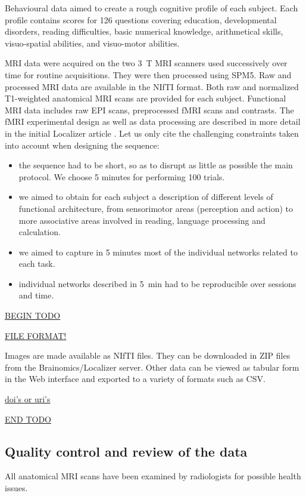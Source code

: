 \documentclass[review]{elsarticle}
\begin{document}
Behavioural data aimed to create a rough cognitive profile of each subject. Each profile contains scores for 126 questions covering education, developmental disorders, reading difficulties, basic numerical knowledge, arithmetical skills, visuo-spatial abilities, and visuo-motor abilities.

MRI data were acquired on the two 3~T MRI scanners used successively over
time for routine acquisitions. They were then processed using SPM5. Raw and processed
MRI data are available in the NIfTI format. Both raw and normalized T1-weighted
anatomical MRI scans are provided for each subject. Functional MRI data includes
raw EPI scans, preprocessed fMRI scans and contrasts. The fMRI experimental design
as well as data processing are described in more detail in the initial Localizer
article \cite{Pinel2007}. Let us only cite the challenging constraints taken
into account when designing the sequence:
\begin{itemize}
\item the sequence had to be short, so as to disrupt as little as possible the main protocol. We choose 5 minutes for performing 100 trials.
\item we aimed to obtain for each subject a description of different levels of functional architecture, from sensorimotor areas (perception and action) to more associative areas involved in reading, language processing and calculation.
\item we aimed to capture in 5 minutes most of the individual networks related to each task.
\item individual networks described in 5~min had to be reproducible over sessions and time.
\end{itemize}

\underline{BEGIN TODO}

\underline{FILE FORMAT!}

Images are made available as NIfTI files. They can be downloaded in ZIP files from
the Brainomics/Localizer server. Other data can be viewed as tabular form in the Web
interface and exported to a variety of formats such as CSV.

\underline{doi's or uri's}

\underline{END TODO}


\subsection{Quality control and review of the data}

All anatomical MRI scans have been examined by radiologists for possible health issues.
\end{document}

